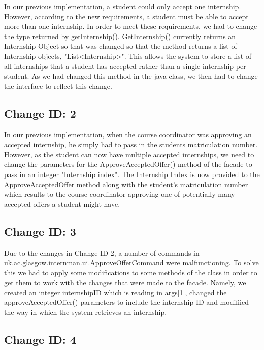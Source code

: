 \documentclass{l3deliverable}
\begin{document}
In our previous implementation, a student could only accept one internship. However, according to the new requirements, a student must be able to accept more than one internship. In order to meet these requirements, we had to change the type returned by getInternship(). GetInternship() currently returns an Internship Object so that was changed so that the method returns a list of Internship objects, "List<Internship>". This allows the system to store a list of all internships that a student has accepted rather than a single internship per student. As we had changed this method in the java class, we then had to change the interface to reflect this change.\\

\subsection{Change ID: 2}

In our previous implementation, when the course coordinator was approving an accepted internship, he simply had to pass in the students matriculation number. However, as the student can now have multiple accepted internships, we need to change the parameters for the ApproveAcceptedOffer() method of the facade to pass in an integer "Internship index". The Internship Index is now provided to the ApproveAcceptedOffer method along with the student's matriculation number which results to the course-coordinator approving one of potentially many accepted offers a student might have.

\subsection{Change ID: 3}

Due to the changes in Change ID 2, a number of commands in uk.ac.glasgow.internman.ui.ApproveOfferCommand were malfunctioning. To solve this we had to apply some modifications to some methods of the class in order to get them to work with the changes that were made to the facade. Namely, we created an integer internshipID which is reading in args[1], changed the approveAcceptedOffer() parameters to include the internship ID and modifiied the way in which the system retrieves an internship.\\


\subsection{Change ID: 4}
\end{document}
